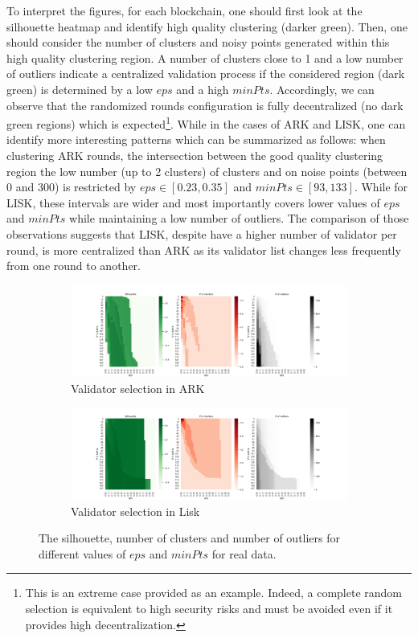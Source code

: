 \documentclass{article}
\begin{document}
To interpret the figures, for each blockchain, one should first look at the silhouette heatmap and identify high quality clustering (darker green). Then, one should consider the number of clusters and noisy points generated within this high quality clustering region. A number of clusters close to 1 and a low number of  outliers indicate a centralized validation process if the considered region (dark green) is determined by a low $eps$ and a high $minPts$. Accordingly, we can observe that the randomized rounds configuration is fully decentralized (no dark green regions) which is expected\footnote{This is an extreme case provided as an example. Indeed, a complete random selection is equivalent to high security risks and must be avoided even if it provides high decentralization.}. While in the cases of ARK and LISK, one can identify more interesting patterns which can be summarized as follows: when clustering ARK rounds, the intersection between the good quality clustering region the low number (up to 2 clusters) of clusters and on noise points (between 0 and 300) is restricted by $eps \in [0.23, 0.35]$ and $minPts \in [93, 133]$. While for LISK, these intervals are wider and most importantly covers lower values of $eps$ and $minPts$ while maintaining a low number of outliers. The comparison of those observations suggests that LISK, despite have a higher number of validator per round, is more centralized than ARK as its validator list changes less frequently from one round to another. 

\begin{figure}
     \centering
     \begin{subfigure}[b]{\textwidth}
         \centering
         \includegraphics[width=\textwidth]{figures/RealN.png}
         \caption{Validator selection in ARK}
         \label{fig:DBARK}
     \end{subfigure}
     \hfill
     \begin{subfigure}[b]{\textwidth}
         \centering
         \includegraphics[width=\textwidth]{figures/LISK1dayNameN.png}
         \caption{Validator selection in Lisk}
         \label{fig:DBLISK}
     \end{subfigure}
    \caption{The silhouette, number of clusters and number of outliers for different values of $eps$ and $minPts$ for real data.}
        \label{fig:db}
\end{figure}
\end{document}

